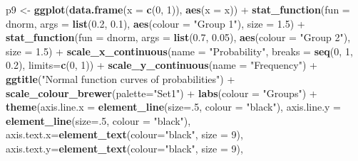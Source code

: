\documentclass[]{article}
\newenvironment{Shaded}{\begin{snugshade}}{\end{snugshade}}
\newcommand{\KeywordTok}[1]{\textcolor[rgb]{0.13,0.29,0.53}{\textbf{{#1}}}}
\newcommand{\DataTypeTok}[1]{\textcolor[rgb]{0.13,0.29,0.53}{{#1}}}
\newcommand{\DecValTok}[1]{\textcolor[rgb]{0.00,0.00,0.81}{{#1}}}
\newcommand{\FloatTok}[1]{\textcolor[rgb]{0.00,0.00,0.81}{{#1}}}
\newcommand{\StringTok}[1]{\textcolor[rgb]{0.31,0.60,0.02}{{#1}}}
\newcommand{\NormalTok}[1]{{#1}}
\begin{document}
\begin{Shaded}
\begin{Highlighting}[]
\NormalTok{p9 <-}\StringTok{ }\KeywordTok{ggplot}\NormalTok{(}\KeywordTok{data.frame}\NormalTok{(}\DataTypeTok{x =} \KeywordTok{c}\NormalTok{(}\DecValTok{0}\NormalTok{, }\DecValTok{1}\NormalTok{)), }\KeywordTok{aes}\NormalTok{(}\DataTypeTok{x =} \NormalTok{x)) +}
\StringTok{      }\KeywordTok{stat_function}\NormalTok{(}\DataTypeTok{fun =} \NormalTok{dnorm, }\DataTypeTok{args =} \KeywordTok{list}\NormalTok{(}\FloatTok{0.2}\NormalTok{, }\FloatTok{0.1}\NormalTok{),}
                    \KeywordTok{aes}\NormalTok{(}\DataTypeTok{colour =} \StringTok{"Group 1"}\NormalTok{), }\DataTypeTok{size =} \FloatTok{1.5}\NormalTok{) +}
\StringTok{      }\KeywordTok{stat_function}\NormalTok{(}\DataTypeTok{fun =} \NormalTok{dnorm, }\DataTypeTok{args =} \KeywordTok{list}\NormalTok{(}\FloatTok{0.7}\NormalTok{, }\FloatTok{0.05}\NormalTok{),}
                    \KeywordTok{aes}\NormalTok{(}\DataTypeTok{colour =} \StringTok{"Group 2"}\NormalTok{), }\DataTypeTok{size =} \FloatTok{1.5}\NormalTok{) +}
\StringTok{      }\KeywordTok{scale_x_continuous}\NormalTok{(}\DataTypeTok{name =} \StringTok{"Probability"}\NormalTok{,}
                         \DataTypeTok{breaks =} \KeywordTok{seq}\NormalTok{(}\DecValTok{0}\NormalTok{, }\DecValTok{1}\NormalTok{, }\FloatTok{0.2}\NormalTok{),}
                         \DataTypeTok{limits=}\KeywordTok{c}\NormalTok{(}\DecValTok{0}\NormalTok{, }\DecValTok{1}\NormalTok{)) +}
\StringTok{      }\KeywordTok{scale_y_continuous}\NormalTok{(}\DataTypeTok{name =} \StringTok{"Frequency"}\NormalTok{) +}
\StringTok{      }\KeywordTok{ggtitle}\NormalTok{(}\StringTok{"Normal function curves of probabilities"}\NormalTok{) +}
\StringTok{      }\KeywordTok{scale_colour_brewer}\NormalTok{(}\DataTypeTok{palette=}\StringTok{"Set1"}\NormalTok{) +}
\StringTok{      }\KeywordTok{labs}\NormalTok{(}\DataTypeTok{colour =} \StringTok{"Groups"}\NormalTok{) +}
\StringTok{      }\KeywordTok{theme}\NormalTok{(}\DataTypeTok{axis.line.x =} \KeywordTok{element_line}\NormalTok{(}\DataTypeTok{size=}\NormalTok{.}\DecValTok{5}\NormalTok{, }\DataTypeTok{colour =} \StringTok{"black"}\NormalTok{),}
            \DataTypeTok{axis.line.y =} \KeywordTok{element_line}\NormalTok{(}\DataTypeTok{size=}\NormalTok{.}\DecValTok{5}\NormalTok{, }\DataTypeTok{colour =} \StringTok{"black"}\NormalTok{), }
            \DataTypeTok{axis.text.x=}\KeywordTok{element_text}\NormalTok{(}\DataTypeTok{colour=}\StringTok{"black"}\NormalTok{, }\DataTypeTok{size =} \DecValTok{9}\NormalTok{), }
            \DataTypeTok{axis.text.y=}\KeywordTok{element_text}\NormalTok{(}\DataTypeTok{colour=}\StringTok{"black"}\NormalTok{, }\DataTypeTok{size =} \DecValTok{9}\NormalTok{),}

\end{Highlighting}
\end{Shaded}
\end{document}
